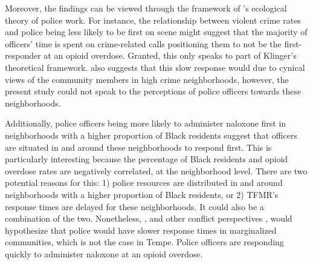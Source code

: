 Moreover, the findings can be viewed through the framework of \citeauthor{klinger_negotiating_1997}'s \citeyear{klinger_negotiating_1997} ecological theory of police work. For instance, the relationship between violent crime rates and police being less likely to be first on scene might suggest that the majority of officers' time is spent on crime-related calls positioning them to not be the first-responder at an opioid overdose. Granted, this only speaks to part of Klinger's theoretical framework. \textcite{klinger_negotiating_1997} also suggests that this slow response would due to cynical views of the community members in high crime neighborhoods, however, the present study could not speak to the perceptions of police officers towards these neighborhoods. 

Additionally, police officers being more likely to administer naloxone first in neighborhoods with a higher proportion of Black residents suggest that officers are situated in and around these neighborhoods to respond first. This is particularly interesting because the percentage of Black residents and opioid overdose rates are negatively correlated, at the neighborhood level. There are two potential reasons for this: 1) police resources are distributed in and around neighborhoods with a higher proportion of Black residents, or 2) TFMR's response times are delayed for these neighborhoods. It could also be a combination of the two. Nonetheless, \textcite{klinger_negotiating_1997}, and other conflict perspectives \parencite{black_manners_1980}, would hypothesize that police would have slower response times in marginalized communities, which is not the case in Tempe. Police officers are responding quickly to administer naloxone at an opioid overdose.

